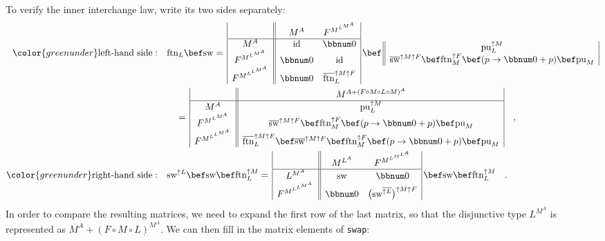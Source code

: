 To verify the inner interchange law, write its two sides separately:
\begin{align*}
{\color{greenunder}\text{left-hand side}:}\quad & \text{ftn}_{L}\bef\text{sw}=\,\begin{array}{|c||cc|}
 & M^{A} & F^{M^{L^{M^{A}}}}\\
\hline M^{A} & \text{id} & \bbnum 0\\
F^{M^{L^{M^{A}}}} & \bbnum 0 & \text{id}\\
F^{M^{L^{L^{M^{A}}}}} & \bbnum 0 & \overline{\text{ftn}}_{L}^{\uparrow M\uparrow F}
\end{array}\,\bef\,\begin{array}{||c|}
\text{pu}_{L}^{\uparrow M}\\
\overline{\text{sw}}^{\uparrow M\uparrow F}\bef\text{ftn}_{M}^{\uparrow F}\bef(p\rightarrow\bbnum 0+p)\bef\text{pu}_{M}
\end{array}\\
 & \quad=\,\begin{array}{|c||c|}
 & M^{A+(F\circ M\circ L\circ M)^{A}}\\
\hline M^{A} & \text{pu}_{L}^{\uparrow M}\\
F^{M^{L^{M^{A}}}} & \overline{\text{sw}}^{\uparrow M\uparrow F}\bef\text{ftn}_{M}^{\uparrow F}\bef(p\rightarrow\bbnum 0+p)\bef\text{pu}_{M}\\
F^{M^{L^{L^{M^{A}}}}} & \overline{\text{ftn}}_{L}^{\uparrow M\uparrow F}\bef\overline{\text{sw}}^{\uparrow M\uparrow F}\bef\text{ftn}_{M}^{\uparrow F}\bef(p\rightarrow\bbnum 0+p)\bef\text{pu}_{M}
\end{array}\quad,\\
{\color{greenunder}\text{right-hand side}:}\quad & \text{sw}^{\uparrow L}\bef\text{sw}\bef\text{ftn}_{L}^{\uparrow M}=\,\begin{array}{|c||cc|}
 & M^{L^{A}} & F^{M^{L^{M^{L^{A}}}}}\\
\hline L^{M^{A}} & \text{sw} & \bbnum 0\\
F^{M^{L^{L^{M^{A}}}}} & \bbnum 0 & \big(\text{sw}^{\overline{\uparrow L}}\big)^{\uparrow M\uparrow F}
\end{array}\,\bef\text{sw}\bef\text{ftn}_{L}^{\uparrow M}\quad.
\end{align*}
In order to compare the resulting matrices, we need to expand the
first row of the last matrix, so that the disjunctive type $L^{M^{A}}$
is represented as $M^{A}+(F\circ M\circ L)^{M^{A}}$. We can then
fill in the matrix elements of \lstinline!swap!:
